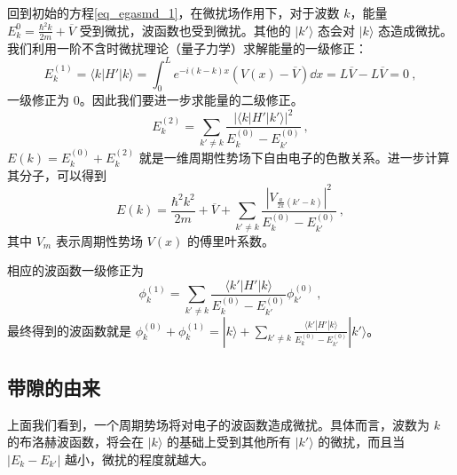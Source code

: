 回到初始的方程\autoref{eq_egasmd_1}，在微扰场作用下，对于波数 $k$，能量 $E_k^{0}=\frac{\hbar^2 k}{2m}+\overline V$ 受到微扰，波函数也受到微扰。其他的 $|k'\rangle$ 态会对 $|k\rangle$ 态造成微扰。我们利用一阶不含时微扰理论（量子力学）求解能量的一级修正：
\begin{equation}
E_k^{(1)}=\langle k|H'|k\rangle=\int_0^L e^{-i(k-k)x}(V(x)-\overline V)\dd x=L\overline V-L\overline V=0~,
\end{equation}
一级修正为 $0$。因此我们要进一步求能量的二级修正。
\begin{equation}
E_k^{(2)}=\sum_{k'\neq k}\frac{|\langle k|H'|k'\rangle|^2}{E_k^{(0)}-E_{k'}^{(0)}}~,
\end{equation}
$E(k)=E_k^{(0)}+E_k^{(2)}$ 就是一维周期性势场下自由电子的色散关系。进一步计算其分子，可以得到
\begin{equation}
E(k)=\frac{\hbar^2 k^2}{2m}+\overline V+\sum_{k'\neq k} \frac{|V_{\frac{a}{2\pi}(k'-k)}|^2}{E_k^{(0)}-E_{k'}^{(0)}}~,
\end{equation}
其中 $V_m$ 表示周期性势场 $V(x)$ 的傅里叶系数。

相应的波函数一级修正为
\begin{equation}
\phi_k^{(1)}=\sum_{k'\neq k}\frac{\langle k'|H'|k\rangle}{E_k^{(0)}-E_{k'}^{(0)}} \phi_{k'}^{(0)}~,
\end{equation}
最终得到的波函数就是 $\phi_k^{(0)}+\phi_k^{(1)}=|k\rangle+\sum_{k'\neq k}\frac{\langle k'|H'|k\rangle}{E_k^{(0)}-E_{k'}^{(0)}} |k'\rangle$。
\subsection{带隙的由来}
上面我们看到，一个周期势场将对电子的波函数造成微扰。具体而言，波数为 $k$ 的布洛赫波函数，将会在 $|k\rangle$ 的基础上受到其他所有 $|k'\rangle$ 的微扰，而且当 $|E_k-E_{k'}|$ 越小，微扰的程度就越大。

